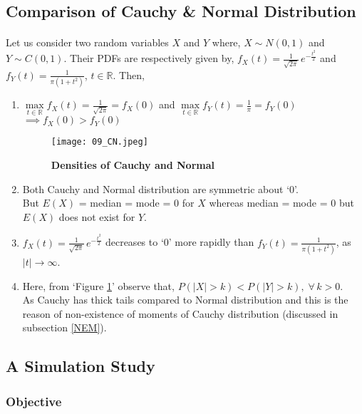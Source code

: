 \documentclass[12pt, fleqn, a4paper]{article}
\begin{document}
	\subsection{Comparison of Cauchy \& Normal Distribution}
	\paragraph{} Let us consider two random variables \(X\) and \(Y\) where, \(X\sim N(0,1)\) and \(Y\sim C(0,1)\). Their PDFs are respectively given by, \(f_X(t)=\frac{1}{\sqrt{2 \pi}}\,e^{-\frac{t^2}{2}}\) and \(f_Y(t)=\frac{1}{\pi (1+t^2)}\), \(t\in\mathbb{R}\). Then, 
	\begin{enumerate}[label = (\alph*)]
		\item \(\max\limits_{t\in\mathbb{R}}f_X(t)=\frac{1} {\sqrt{2\pi}}=f_X(0)\) and \(\max\limits_{t\in \mathbb{R}}f_Y(t)=\frac{1}{\pi}=f_Y(0)\) \\
		\(\implies f_X(0)>f_Y(0)\)
		\begin{figure}[H] \centering
			\texttt{[image: 09\_CN.jpeg]}
			\caption{\textbf{Densities of Cauchy and Normal}}
			\label{CN}
		\end{figure}
	
		\item Both Cauchy and Normal distribution are symmetric about `0'.\\ But \(E(X)\) = median = mode = 0 for \(X\) whereas median = mode = 0 but \(E(X)\) does not exist for \(Y\).
		
		\item \(f_X(t)=\frac{1}{\sqrt{2 \pi}}\,e^{-\frac{t^2} {2}}\) decreases to `0' more rapidly than \(f_Y(t)= \frac{1}{\pi (1+t^2)}\), as \(|t|\to\infty\).
		
		\item Here, from `Figure \ref{CN}' observe that, \(P(|X|>k)<P(|Y|>k),\;\forall\,k>0\). \\
		As Cauchy has thick tails compared to Normal distribution and this is the reason of non-existence of moments of Cauchy distribution (discussed in subsection \ref{NEM}). 
	\end{enumerate}
	
	\subsection{A Simulation Study}
	\subsubsection*{Objective}
\end{document}
